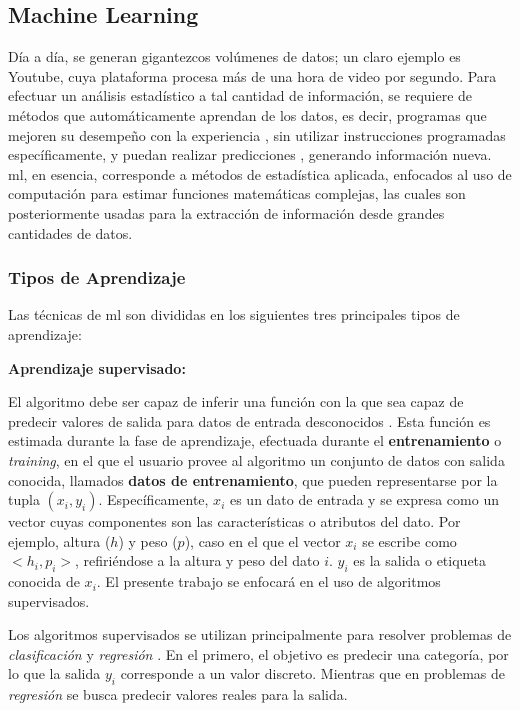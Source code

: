 \subsection{Machine Learning}
%
Día a día, se generan gigantezcos volúmenes de datos; un claro ejemplo es Youtube, cuya plataforma procesa más de una hora de video por segundo. Para efectuar un análisis estadístico a tal cantidad de información, se requiere de métodos que automáticamente aprendan de los datos, es decir, programas que mejoren su desempeño con la experiencia \cite{Mitchell}, sin utilizar instrucciones programadas específicamente, y puedan realizar predicciones \cite{Murphy}, generando información nueva.
%
\acrshort{ml}, en esencia, corresponde a métodos de estadística aplicada, enfocados al uso de computación para estimar funciones matemáticas complejas, las cuales son posteriormente usadas para la extracción de información desde grandes cantidades de datos.

\subsubsection{Tipos de Aprendizaje}

Las técnicas de \acrshort{ml} son divididas en los siguientes tres principales tipos de aprendizaje:
%

\textbf{Aprendizaje supervisado:} 
%

El algoritmo debe ser capaz de inferir una función con la que sea capaz de predecir valores de salida para datos de entrada desconocidos \cite{Muller}. Esta función es estimada durante la fase de aprendizaje, efectuada durante el \textbf{entrenamiento} o \emph{training}, en el que el usuario provee al algoritmo un conjunto de datos con salida conocida, llamados \textbf{datos de entrenamiento}, que pueden representarse por la tupla $(x_i, y_i)$. Específicamente, $x_i$ es un dato de entrada y se expresa como un vector cuyas componentes son las características o atributos del dato. Por ejemplo, altura ($h$) y peso ($p$), caso en el que el vector $x_i$ se escribe como $<h_i,p_i>$, refiriéndose a la altura y peso del dato $i$. $y_i$ es la salida o etiqueta conocida de $x_i$. El presente trabajo se enfocará en el uso de algoritmos supervisados.
%

Los algoritmos supervisados se utilizan principalmente para resolver problemas de \textit{clasificación} y \textit{regresión} \cite{Murphy}. En el primero, el objetivo es predecir una categoría, por lo que la salida $y_i$ corresponde a un valor discreto. Mientras que en problemas de \textit{regresión} se busca predecir valores reales para la salida.
%

